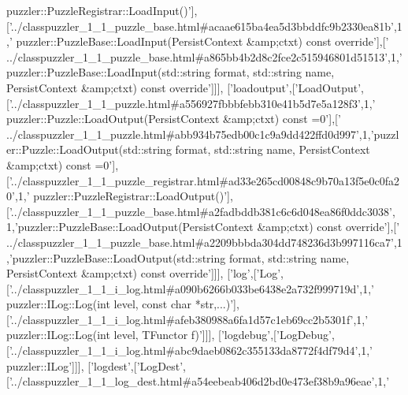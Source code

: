 \begin{DoxyCode}
{      puzzler::PuzzleRegistrar::LoadInput()'}],[\textcolor{stringliteral}{'../classpuzzler\_1\_1\_puzzle\_base.html#acaae615ba4ea5d3bbddfc9b2330ea81b'},1,\textcolor{stringliteral}{'
      puzzler::PuzzleBase::LoadInput(PersistContext &amp;ctxt) const override'}],[\textcolor{stringliteral}{'
      ../classpuzzler\_1\_1\_puzzle\_base.html#a865bb4b2d8c2fce2c515946801d51513'},1,\textcolor{stringliteral}{'puzzler::PuzzleBase::LoadInput(std::string format, std::string
       name, PersistContext &amp;ctxt) const override'}]]],
  [\textcolor{stringliteral}{'loadoutput'},[\textcolor{stringliteral}{'LoadOutput'},[\textcolor{stringliteral}{'../classpuzzler\_1\_1\_puzzle.html#a556927fbbbfebb310e41b5d7e5a128f3'},1,\textcolor{stringliteral}{'
      puzzler::Puzzle::LoadOutput(PersistContext &amp;ctxt) const =0'}],[\textcolor{stringliteral}{'
      ../classpuzzler\_1\_1\_puzzle.html#abb934b75edb00c1c9a9dd422ffd0d997'},1,\textcolor{stringliteral}{'puzzler::Puzzle::LoadOutput(std::string format, std::string name, PersistContext
       &amp;ctxt) const =0'}],[\textcolor{stringliteral}{'../classpuzzler\_1\_1\_puzzle\_registrar.html#ad33e265cd00848c9b70a13f5e0c0fa20'},1,\textcolor{stringliteral}{'
      puzzler::PuzzleRegistrar::LoadOutput()'}],[\textcolor{stringliteral}{'../classpuzzler\_1\_1\_puzzle\_base.html#a2fadbddb381c6c6d048ea86f0ddc3038'},
      1,\textcolor{stringliteral}{'puzzler::PuzzleBase::LoadOutput(PersistContext &amp;ctxt) const override'}],[\textcolor{stringliteral}{'
      ../classpuzzler\_1\_1\_puzzle\_base.html#a2209bbbda304dd748236d3b997116ca7'},1,\textcolor{stringliteral}{'puzzler::PuzzleBase::LoadOutput(std::string format,
       std::string name, PersistContext &amp;ctxt) const override'}]]],
  [\textcolor{stringliteral}{'log'},[\textcolor{stringliteral}{'Log'},[\textcolor{stringliteral}{'../classpuzzler\_1\_1\_i\_log.html#a090b6266b033be6438e2a732f999719d'},1,\textcolor{stringliteral}{'
      puzzler::ILog::Log(int level, const char *str,...)'}],[\textcolor{stringliteral}{'../classpuzzler\_1\_1\_i\_log.html#afeb380988a6fa1d57c1eb69cc2b5301f'},1,\textcolor{stringliteral}{'
      puzzler::ILog::Log(int level, TFunctor f)'}]]],
  [\textcolor{stringliteral}{'logdebug'},[\textcolor{stringliteral}{'LogDebug'},[\textcolor{stringliteral}{'../classpuzzler\_1\_1\_i\_log.html#abc9daeb0862c355133da8772f4df79d4'},1,\textcolor{stringliteral}{'
      puzzler::ILog'}]]],
  [\textcolor{stringliteral}{'logdest'},[\textcolor{stringliteral}{'LogDest'},[\textcolor{stringliteral}{'../classpuzzler\_1\_1\_log\_dest.html#a54eebeab406d2bd0e473ef38b9a96eae'},1,\textcolor{stringliteral}{'
}
\end{DoxyCode}
